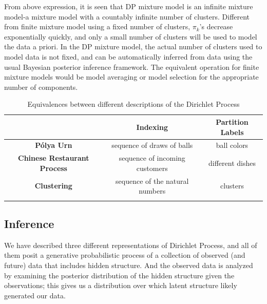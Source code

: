 From above expression, it is seen that DP mixture model is an infinite mixture model-a mixture model with a countably infinite number of clusters. Different from finite mixture model using a fixed number of clusters, $\pi_k$'s decrease exponentially quickly, and only a small number of clusters will be used to model the data a priori. In the DP mixture model, the actual number of clusters used to model data is not fixed, and can be automatically inferred from data using the usual Bayesian posterior inference framework. The equivalent operation for finite mixture models would be model averaging or model selection for the appropriate number of components.
\\
\begin{table}[!htbp]
\caption{Equivalences between different descriptions of the Dirichlet Process}
\centering
\begin{tabular*}{\textwidth}{|c|c|c|}
	\hline \rule[-2ex]{0pt}{5.5ex}  & \textbf{Indexing}& \textbf{Partition Labels} \\ 
	\hline \rule[-2ex]{0pt}{5.5ex}  \textbf{P\'{o}lya Urn} & sequence of draws of balls  & ball colors  \\ 
	\hline \rule[-2ex]{0pt}{5.5ex} \textbf{Chinese Restaurant Process} & sequence of incoming customers &  different dishes\\ 
	\hline \rule[-2ex]{0pt}{5.5ex}  \textbf{Clustering} & sequence of the natural numbers  & clusters \\ 
	\hline 
	\title{}
\end{tabular*}
\end{table}

	\subsection{Inference}
	We have described three different representations of Dirichlet Process, and all of them posit a generative probabilistic process of a collection of observed (and future) data that includes hidden structure. And the observed data is analyzed by examining the posterior distribution of the hidden structure given the observations; this
	gives us a distribution over which latent structure likely generated our data. 
	
